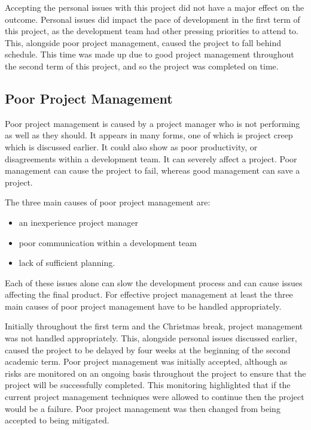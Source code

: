\documentclass{article}
\begin{document}
Accepting the personal issues with this project did not have a major effect on the outcome. Personal issues did impact the pace of development in the first term of this project, as the development team had other pressing priorities to attend to. This, alongside poor project management, caused the project to fall behind schedule. This time was made up due to good project management throughout the second term of this project, and so the project was completed on time. \par

\subsection{Poor Project Management}

Poor project management is caused by a project manager who is not performing as well as they should. It appears in many forms, one of which is project creep which is discussed earlier. It could also show as poor productivity, or disagreements within a development team. It can severely affect a project. Poor management can cause the project to fail, whereas good management can save a project. \par

The three main causes of poor project management are:

\begin{itemize}
	\item an inexperience project manager
	\item poor communication within a development team
	\item lack of sufficient planning.
\end{itemize}

Each of these issues alone can slow the development process and can cause issues affecting the final product. For effective project management at least the three main causes of poor project management have to be handled appropriately. \par

Initially throughout the first term and the Christmas break, project management was not handled appropriately. This, alongside personal issues discussed earlier, caused the project to be delayed by four weeks at the beginning of the second academic term. Poor project management was initially accepted, although as risks are monitored on an ongoing basis throughout the project to ensure that the project will be successfully completed. This monitoring highlighted that if the current project management techniques were allowed to continue then the project would be a failure. Poor project management was then changed from being accepted to being mitigated. \par
\end{document}
